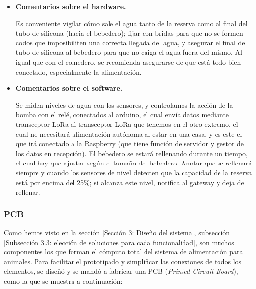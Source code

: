 \documentclass[12pt]{article}
\begin{document}
	\begin{itemize}
		\item \textbf{Comentarios sobre el hardware.}
		\begin{outline}
			\1 Es conveniente vigilar cómo sale el agua tanto de la reserva como al final del tubo de silicona (hacia el bebedero); fijar con bridas para que no se formen codos que imposibiliten una correcta llegada del agua, y asegurar el final del tubo de silicona al bebedero para que no caiga el agua fuera del mismo.
			\1 Al igual que con el comedero, se recomienda asegurarse de que está todo bien conectado, especialmente la alimentación.
		\end{outline}
		\item \textbf{Comentarios sobre el software.}
		\begin{outline}
			\1 Se miden niveles de agua con los sensores, y controlamos la acción de la bomba con el relé, conectados al arduino, el cual envía datos mediante transceptor LoRa al transceptor LoRa que tenemos en el otro extremo, el cual no necesitará alimentación autónoma al estar en una casa, y es este el que irá conectado a la Raspberry (que tiene función de servidor y gestor de los datos en recepción).
			\1 El bebedero se estará rellenando durante un tiempo, el cual hay que ajustar según el tamaño del bebedero. Anotar que se rellenará siempre y cuando los sensores de nivel detecten que la capacidad de la reserva está por encima del 25\%; si alcanza este nivel, notifica al gateway y deja de rellenar.
		\end{outline}
	\end{itemize}


	
	\subsubsection{PCB}
	
	\noindent Como hemos visto en la sección \ref{Sección 3: Diseño del sistema}, subsección \ref{Subsección 3.3: elección de soluciones para cada funcionalidad}, son muchos componentes los que forman el cómputo total del sistema de alimentación para animales. Para facilitar el prototipado y simplificar las conexiones de todos los elementos, se diseñó y se mandó a fabricar una PCB (\textit{Printed Circuit Board}), como la que se muestra a continuación: \\
	
\end{document}

